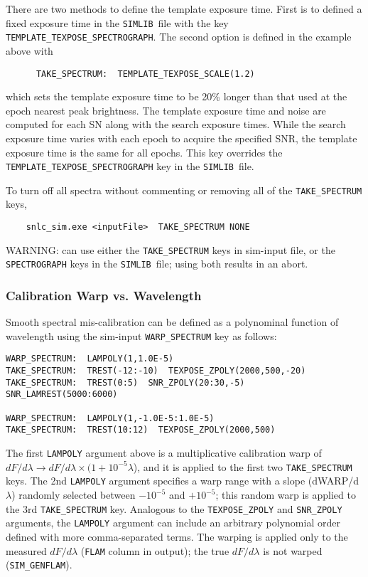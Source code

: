 \documentclass[12pt]{article}
\newcommand{\SPEC}{{\tt SPECTROGRAPH}}
\newcommand{\Flam}{dF/d\lambda}
\newcommand{\simlib}{{\tt SIMLIB}}
\begin{document}
\medskip
There are two methods to define the template exposure time.
First is to defined a fixed exposure time in the \simlib\ file
with the key {\tt TEMPLATE\_TEXPOSE\_SPECTROGRAPH}.
The second option is defined in the example above with
%
\vspace{-0.4cm}
\begin{verbatim}
      TAKE_SPECTRUM:  TEMPLATE_TEXPOSE_SCALE(1.2)
\end{verbatim}
%
which sets the template exposure time to be 20\% longer than
that used at the epoch nearest peak brightness. 
The template exposure time and noise are computed for each SN
along with the search exposure times. While the search
exposure time varies with each epoch to acquire the specified
SNR, the template exposure time is the same for all epochs.
This key overrides the {\tt TEMPLATE\_TEXPOSE\_SPECTROGRAPH} 
key in the \simlib\ file.

\medskip
To turn off all spectra without commenting or removing all of the 
{\tt TAKE\_SPECTRUM} keys, 
\vspace{-0.4cm}
\begin{verbatim}
    snlc_sim.exe <inputFile>  TAKE_SPECTRUM NONE
\end{verbatim}

\medskip
WARNING: can use either the {\tt TAKE\_SPECTRUM} keys in sim-input file,
or the {\SPEC} keys in the \simlib\ file; using both results in an abort.


\subsubsection{Calibration Warp vs. Wavelength}
\label{sss:SPEC_WARP}

Smooth spectral mis-calibration can be defined as a polynominal
function of wavelength using the sim-input 
{\tt WARP\_SPECTRUM} key as follows:
%
\begin{Verbatim}[frame=single]
WARP_SPECTRUM:  LAMPOLY(1,1.0E-5)
TAKE_SPECTRUM:  TREST(-12:-10)  TEXPOSE_ZPOLY(2000,500,-20)
TAKE_SPECTRUM:  TREST(0:5)  SNR_ZPOLY(20:30,-5)  SNR_LAMREST(5000:6000)

WARP_SPECTRUM:  LAMPOLY(1,-1.0E-5:1.0E-5)
TAKE_SPECTRUM:  TREST(10:12)  TEXPOSE_ZPOLY(2000,500)
\end{Verbatim}
%
The first {\tt LAMPOLY} argument above is a multiplicative
calibration warp of $\Flam \to \Flam \times (1+10^{-5}\lambda$), 
and it is applied to the first two {\tt TAKE\_SPECTRUM} keys.
The 2nd {\tt LAMPOLY} argument specifies a warp range with a slope 
(dWARP/d$\lambda$) randomly selected between $-10^{-5}$ and $+10^{-5}$;
this random warp is applied to the 3rd {\tt TAKE\_SPECTRUM} key.
Analogous to the {\tt TEXPOSE\_ZPOLY} and {\tt SNR\_ZPOLY} arguments,
the {\tt LAMPOLY} argument can include an arbitrary polynomial order 
defined with more comma-separated terms. 
The warping is applied only to the measured $\Flam$ 
({\tt FLAM} column in output); 
the true $\Flam$ is not warped ({\tt SIM\_GENFLAM}).
\end{document}
